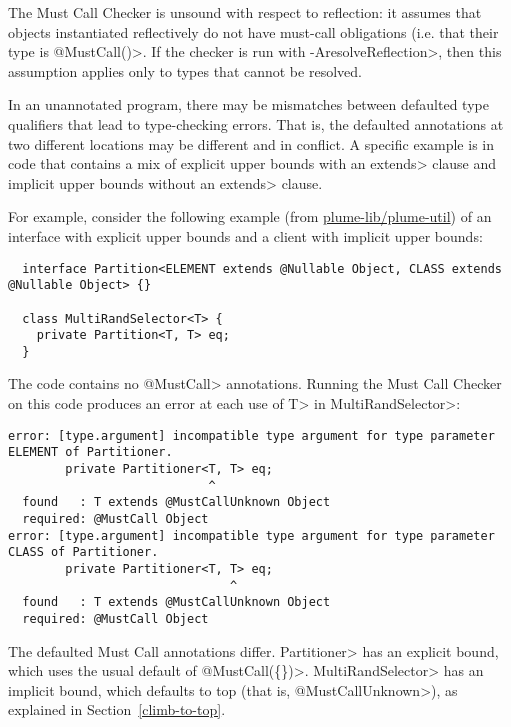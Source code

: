 The Must Call Checker is unsound with respect to reflection: it assumes
that objects instantiated reflectively do not have must-call obligations (i.e. that their
type is \<@MustCall({})>. If the checker is run with \<-AresolveReflection>, then
this assumption applies only to types that cannot be resolved.


In an unannotated program, there may be mismatches between defaulted type
qualifiers that lead to type-checking errors.  That is, the defaulted
annotations at two different locations may be different and in conflict.  A
specific example is in code that contains a mix of explicit upper bounds
with an \<extends> clause and implicit upper bounds without an \<extends>
clause.

For example, consider the following example (from
\href{https://github.com/plume-lib/plume-util}{plume-lib/plume-util}) of an
interface with explicit upper bounds and a client with implicit upper
bounds:
\begin{Verbatim}
  interface Partition<ELEMENT extends @Nullable Object, CLASS extends @Nullable Object> {}

  class MultiRandSelector<T> {
    private Partition<T, T> eq;
  }
\end{Verbatim}

The code contains no \<@MustCall> annotations.
Running the Must Call Checker on this code produces an error at each use
of \<T> in \<MultiRandSelector>:

\begin{smaller}
\begin{Verbatim}
error: [type.argument] incompatible type argument for type parameter ELEMENT of Partitioner.
        private Partitioner<T, T> eq;
                            ^
  found   : T extends @MustCallUnknown Object
  required: @MustCall Object
error: [type.argument] incompatible type argument for type parameter CLASS of Partitioner.
        private Partitioner<T, T> eq;
                               ^
  found   : T extends @MustCallUnknown Object
  required: @MustCall Object
\end{Verbatim}
\end{smaller}

The defaulted Must Call annotations differ.
\<Partitioner> has an explicit bound, which uses the usual default of \<@MustCall(\{\})>.
\<MultiRandSelector> has an implicit bound, which defaults to top (that is,
\<@MustCallUnknown>), as explained in Section~\ref{climb-to-top}.

